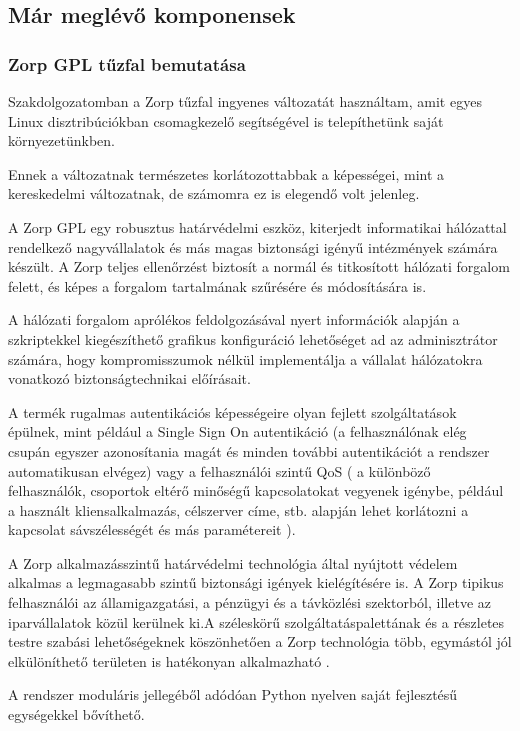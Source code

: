 \documentclass[a4paper,12pt,oneside]{report}
\begin{document}
\subsection{Már meglévő komponensek}

\subsubsection{Zorp GPL tűzfal bemutatása} \cite{website:zorp}
Szakdolgozatomban a Zorp tűzfal ingyenes változatát használtam, amit egyes Linux disztribúciókban csomagkezelő segítségével is telepíthetünk saját környezetünkben.

Ennek a változatnak természetes korlátozottabbak a képességei, mint a kereskedelmi változatnak, de számomra ez is elegendő volt jelenleg.

A Zorp GPL egy robusztus határvédelmi eszköz, kiterjedt informatikai hálózattal rendelkező nagyvállalatok és más magas biztonsági igényű intézmények számára készült.
A Zorp teljes ellenőrzést biztosít a normál és titkosított hálózati forgalom felett, és 
képes a forgalom tartalmának szűrésére és módosítására is. 

A hálózati forgalom aprólékos feldolgozásával nyert információk alapján a 
szkriptekkel kiegészíthető grafikus konfiguráció lehetőséget ad az adminisztrátor 
számára, hogy kompromisszumok nélkül implementálja a vállalat hálózatokra 
vonatkozó biztonságtechnikai előírásait.

A termék rugalmas autentikációs képességeire olyan fejlett szolgáltatások épülnek, 
mint például a Single Sign On autentikáció (a felhasználónak elég csupán egyszer 
azonosítania magát és minden további autentikációt a rendszer automatikusan 
elvégez) vagy a felhasználói szintű QoS ( a különböző felhasználók, csoportok eltérő
minőségű kapcsolatokat vegyenek igénybe, például a használt kliensalkalmazás, 
célszerver címe, stb. alapján lehet korlátozni a kapcsolat sávszélességét és más 
paramétereit ).

A Zorp alkalmazásszintű határvédelmi technológia által nyújtott védelem alkalmas a 
legmagasabb szintű biztonsági igények kielégítésére is. A Zorp tipikus felhasználói 
az államigazgatási, a pénzügyi és a távközlési szektorból, illetve az iparvállalatok 
közül kerülnek ki.A széleskörű szolgáltatáspalettának és a részletes testre szabási lehetőségeknek köszönhetően a Zorp technológia több, egymástól jól elkülöníthető területen is hatékonyan alkalmazható .

A rendszer moduláris jellegéből adódóan Python nyelven saját fejlesztésű 
egységekkel bővíthető.
\\
\end{document}

